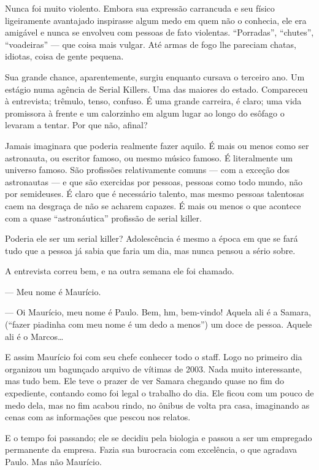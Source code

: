 Nunca foi muito violento. Embora sua expressão carrancuda e seu físico ligeiramente avantajado inspirasse algum medo em quem não o conhecia, ele era amigável e nunca se envolveu com pessoas de fato violentas. ``Porradas'', ``chutes'', ``voadeiras'' --- que coisa mais vulgar. Até armas de fogo lhe pareciam chatas, idiotas, coisa de gente pequena.

Sua grande chance, aparentemente, surgiu enquanto cursava o terceiro ano. Um estágio numa agência de Serial Killers. Uma das maiores do estado. Compareceu à entrevista; trêmulo, tenso, confuso. É uma grande carreira, é claro; uma vida promissora à frente e um calorzinho em algum lugar ao longo do esôfago o levaram a tentar. Por que não, afinal?

Jamais imaginara que poderia realmente fazer aquilo. É mais ou menos como ser astronauta, ou escritor famoso, ou mesmo músico famoso. É literalmente um universo famoso. São profissões relativamente comuns --- com a exceção dos astronautas --- e que são exercidas por pessoas, pessoas como todo mundo, não por semideuses. É claro que é necessário talento, mas mesmo pessoas talentosas caem na desgraça de não se acharem capazes. É mais ou menos o que acontece com a quase ``astronáutica'' profissão de serial killer.

Poderia ele ser um serial killer? Adolescência é mesmo a época em que se fará tudo que a pessoa já sabia que faria um dia, mas nunca pensou a sério sobre.

A entrevista correu bem, e na outra semana ele foi chamado.

--- Meu nome é Maurício.

--- Oi Maurício, meu nome é Paulo. Bem, hm, bem-vindo! Aquela ali é a Samara, (``fazer piadinha com meu nome é um dedo a menos'') um doce de pessoa. Aquele ali é o Marcos\ldots

E assim Maurício foi com seu chefe conhecer todo o staff. Logo no primeiro dia organizou um bagunçado arquivo de vítimas de 2003. Nada muito interessante, mas tudo bem. Ele teve o prazer de ver Samara chegando quase no fim do expediente, contando como foi legal o trabalho do dia. Ele ficou com um pouco de medo dela, mas no fim acabou rindo, no ônibus de volta pra casa, imaginando as cenas com as informações que pescou nos relatos.

E o tempo foi passando; ele se decidiu pela biologia e passou a ser um empregado permanente da empresa. Fazia sua burocracia com excelência, o que agradava Paulo. Mas não Maurício.

